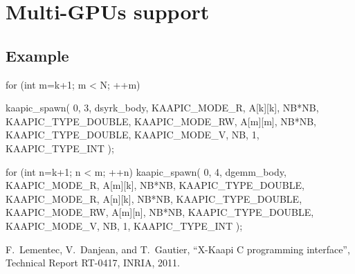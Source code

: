 \documentclass[a4paper, 11pt]{article}
\makeatletter
\newenvironment{apisection}[2][noshortnameprovided]{%
  \newpage
  \section{#2}
  \label{api@#1}
  \newcommand{\api@newpart}[4][noshortpartnameprovided]{%
    \newenvironment{##1}{%
      \subsection{##2}%
      \label{api@#1@##1}%
      ##3%
    }{##4}%
  }%
  \api@newpart[synopsis]{Synopsis}{}{}%
  \api@newpart[call]{Call}{}{}%
  \api@newpart[desc]{Description}{}{}%
  \api@newpart[params]{Parameters}{%
    \let\api@indesc\@empty
    \newcommand{\param}[1]{%
      \def\api@indesc{yes}%
      \begin{description}%
        \renewcommand{\param}[1]{\item[########1]}%
      \item[####1]
      }%
      \newenvironment{parameters}{%
        \begin{description}%
          \renewcommand{\param}[1]{\item[########1]}%
        }{%
        \end{description}%
      }
    }{%
      \ifx\api@indesc\@empty\relax\else%
    \end{description}%
    \fi%
  }%
  \api@newpart[ret]{Return value}{%
    \newcommand{\otherret}{\par\medskip\noindent}%
  }{}%
  \api@newpart[example]{Example}{}{}%
}{}
\makeatother
\begin{document}
\begin{apisection}[gpus]{Multi-GPUs support}
\begin{example}
\begin{code}
{      for (int m=k+1; m < N; ++m)
      {
        kaapic_spawn( 0, 3, dsyrk_body,
          KAAPIC_MODE_R,  A[k][k], NB*NB, KAAPIC_TYPE_DOUBLE,
          KAAPIC_MODE_RW, A[m][m], NB*NB, KAAPIC_TYPE_DOUBLE, 
          KAAPIC_MODE_V, NB, 1, KAAPIC_TYPE_INT
        );

        for (int n=k+1; n < m; ++n)
        {
          kaapic_spawn( 0, 4, dgemm_body,
            KAAPIC_MODE_R,  A[m][k], NB*NB, KAAPIC_TYPE_DOUBLE,
            KAAPIC_MODE_R, A[n][k], NB*NB, KAAPIC_TYPE_DOUBLE, 
            KAAPIC_MODE_RW, A[m][n], NB*NB, KAAPIC_TYPE_DOUBLE, 
            KAAPIC_MODE_V, NB, 1, KAAPIC_TYPE_INT
          );
        }
      }
    }
  \end{code}
  \end{example}
\end{apisection}

\newpage
\begin{thebibliography}{10}
F.~Lementec, V.~Danjean, and T.~Gautier, ``{X-Kaapi C programming interface}'', Technical Report RT-0417, INRIA, 2011.
\end{thebibliography}
\end{document}
